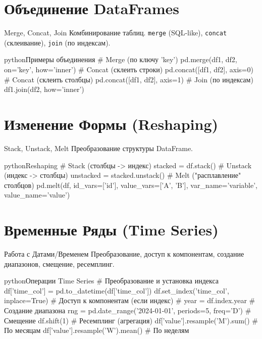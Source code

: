     \section{Объединение DataFrames}
    
    \begin{textbox}{{Merge, Concat, Join}}
    Комбинирование таблиц. \texttt{merge} (SQL-like), \texttt{concat} (склеивание), \texttt{join} (по индексам).
    \begin{codebox}{python}{Примеры объединения}
    # Merge (по ключу 'key')
    pd.merge(df1, df2, on='key', how='inner')
    # Concat (склеить строки)
    pd.concat([df1, df2], axis=0)
    # Concat (склеить столбцы)
    pd.concat([df1, df2], axis=1)
    # Join (по индексам)
    df1.join(df2, how='inner')
    \end{codebox}
    \end{textbox}
    
    \section{Изменение Формы (Reshaping)}
    
    \begin{myblock}{{Stack, Unstack, Melt}}
    Преобразование структуры DataFrame.
    \begin{codebox}{python}{Reshaping}
    # Stack (столбцы -> индекс)
    stacked = df.stack()
    # Unstack (индекс -> столбцы)
    unstacked = stacked.unstack()
    # Melt ("расплавление" столбцов)
    pd.melt(df, id_vars=['id'], value_vars=['A', 'B'],
            var_name='variable', value_name='value')
    \end{codebox}
    \end{myblock}
    
    \section{Временные Ряды (Time Series)}
    
    \begin{textbox}{Работа с Датами/Временем}
    Преобразование, доступ к компонентам, создание диапазонов, смещение, ресемплинг.
    \begin{codebox}{python}{Операции Time Series}
    # Преобразование и установка индекса
    df['time_col'] = pd.to_datetime(df['time_col'])
    df.set_index('time_col', inplace=True)
    # Доступ к компонентам (если индекс)
    # year = df.index.year
    # Создание диапазона
    rng = pd.date_range('2024-01-01', periods=5, freq='D')
    # Смещение
    df.shift(1)
    # Ресемплинг (агрегация)
    df['value'].resample('M').sum() # По месяцам
    df['value'].resample('W').mean() # По неделям
    \end{codebox}
    \end{textbox}
    
